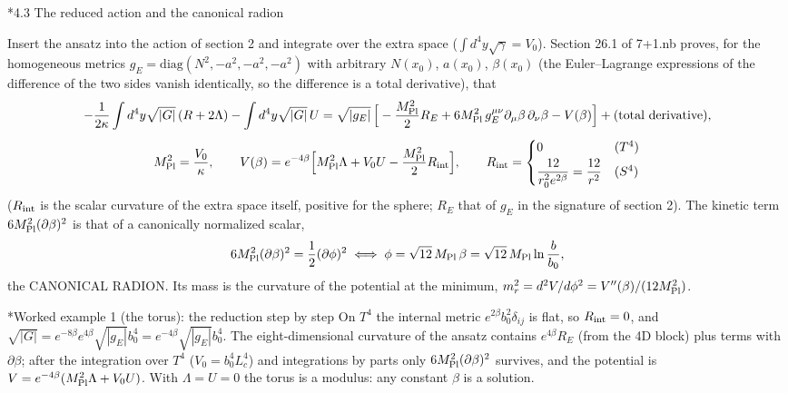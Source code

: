 \documentclass[10pt,a4paper]{article}
\makeatletter
\renewcommand\subsection{\@startsection{subsection}{2}{\z@}{-3.25ex\@plus -1ex \@minus -.2ex}{1.5ex \@plus .2ex}{\normalfont\large\bfseries\raggedright}}
\renewcommand\subsubsection{\@startsection{subsubsection}{3}{\z@}{-3.25ex\@plus -1ex \@minus -.2ex}{1.5ex \@plus .2ex}{\normalfont\normalsize\bfseries\raggedright}}
\makeatother
\begin{document}
\subsection*{4.3 The reduced action and the canonical radion}
Insert the ansatz into the action of section 2 and integrate over the extra space ($\int d^4y\sqrt\gamma=V_0$). Section 26.1 of 7+1.nb proves, for the homogeneous metrics $g_E=\mathrm{diag}(N^2,-a^2,-a^2,-a^2)$ with arbitrary $N(x_0)$, $a(x_0)$, $\beta(x_0)$ (the Euler–Lagrange expressions of the difference of the two sides vanish identically, so the difference is a total derivative), that
\begin{equation*}
-\frac1{2\kappa}\int d^4y\sqrt{|G|}\,(R+2\Lambda)-\int d^4y\sqrt{|G|}\,U=\sqrt{|g_E|}\,\Big[-\frac{M_{\rm Pl}^2}2R_E+6M_{\rm Pl}^2\,g_E^{\mu\nu}\partial_\mu\beta\,\partial_\nu\beta-V(\beta)\Big]+\text{(total derivative)},
\end{equation*}
\begin{equation*}
M_{\rm Pl}^2=\frac{V_0}\kappa,\qquad V(\beta)=e^{-4\beta}\Big[M_{\rm Pl}^2\Lambda+V_0U-\frac{M_{\rm Pl}^2}2R_{\rm int}\Big],\qquad R_{\rm int}=\begin{cases}0&(T^4)\\[2pt] \dfrac{12}{r_0^2e^{2\beta}}=\dfrac{12}{r^2}&(S^4)\end{cases}
\end{equation*}
($R_{\rm int}$ is the scalar curvature of the extra space itself, positive for the sphere; $R_E$ that of $g_E$ in the signature of section 2). The kinetic term $6M_{\rm Pl}^2(\partial\beta)^2$ is that of a canonically normalized scalar,
\begin{equation*}
6M_{\rm Pl}^2(\partial\beta)^2=\frac12(\partial\phi)^2\iff \phi=\sqrt{12}\,M_{\rm Pl}\,\beta=\sqrt{12}\,M_{\rm Pl}\ln\frac b{b_0},
\end{equation*}
the CANONICAL RADION. Its mass is the curvature of the potential at the minimum, $m_r^2=d^2V/d\phi^2=V''(\beta)/(12M_{\rm Pl}^2)$.

\subsubsection*{Worked example 1 (the torus): the reduction step by step}
On $T^4$ the internal metric $e^{2\beta}b_0^2\delta_{ij}$ is flat, so $R_{\rm int}=0$, and $\sqrt{|G|}=e^{-8\beta}e^{4\beta}\sqrt{|g_E|}b_0^4=e^{-4\beta}\sqrt{|g_E|}b_0^4$. The eight-dimensional curvature of the ansatz contains $e^{4\beta}R_E$ (from the 4D block) plus terms with $\partial\beta$; after the integration over $T^4$ ($V_0=b_0^4L_c^4$) and integrations by parts only $6M_{\rm Pl}^2(\partial\beta)^2$ survives, and the potential is $V=e^{-4\beta}(M_{\rm Pl}^2\Lambda+V_0U)$. With $\Lambda=U=0$ the torus is a modulus: any constant $\beta$ is a solution.
\end{document}
